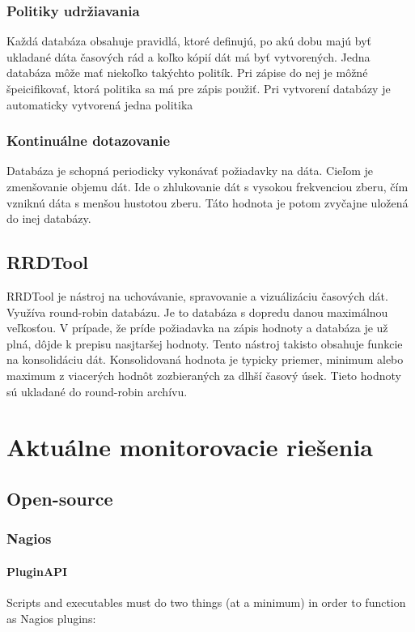 \documentclass[11pt,final,oneside]{fithesis}
\begin{document}
\subsection{Politiky udržiavania}
Každá databáza obsahuje pravidlá, ktoré definujú, po akú dobu majú byť ukladané dáta časových rád a koľko kópií dát má byť vytvorených. Jedna databáza môže mať niekoľko takýchto politík. Pri zápise 
do nej je môžné špeicifikovať, ktorá politika sa má pre zápis použiť. Pri vytvorení databázy je automaticky vytvorená jedna politika

\subsection{Kontinuálne dotazovanie}
Databáza je schopná periodicky vykonávať požiadavky na dáta. Cieľom je zmenšovanie objemu dát. Ide o zhlukovanie dát s vysokou frekvenciou zberu, čím vzniknú dáta s menšou hustotou zberu. Táto hodnota je 
potom zvyčajne uložená do inej databázy.

\section{RRDTool}
RRDTool je nástroj na uchovávanie, spravovanie a vizuálizáciu časových dát. Využíva round-robin databázu. Je to databáza s dopredu danou maximálnou veľkosťou. V prípade, že príde požiadavka na zápis hodnoty 
a databáza je už plná, dôjde k prepisu nasjtaršej hodnoty. Tento nástroj takisto obsahuje funkcie na konsolidáciu dát. Konsolidovaná hodnota je typicky priemer, minimum alebo maximum z viacerých hodnôt zozbieraných 
za dlhší časový úsek. Tieto hodnoty sú ukladané do round-robin archívu.

\chapter{Aktuálne monitorovacie riešenia}
\section{Open-source}
\subsection{Nagios}
\subsubsection{PluginAPI}
Scripts and executables must do two things (at a minimum) in order to function as Nagios plugins:
\end{document}
